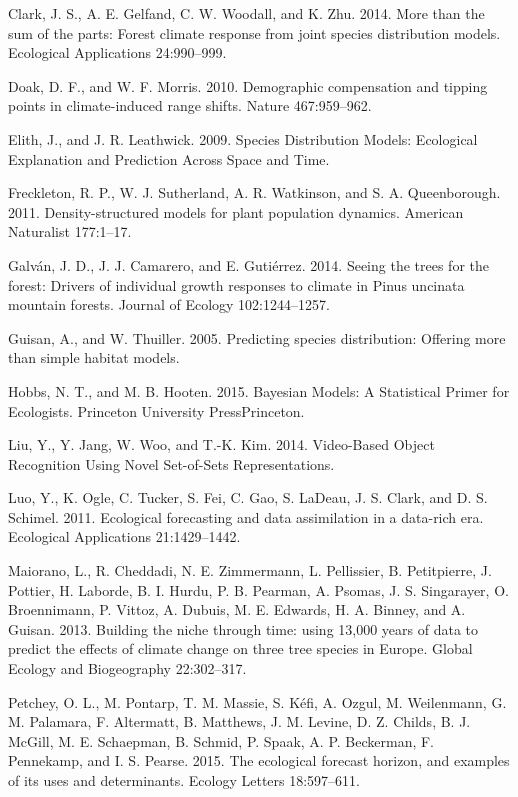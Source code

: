 \documentclass[12pt,]{article}
\begin{document}
Clark, J. S., A. E. Gelfand, C. W. Woodall, and K. Zhu. 2014. More than
the sum of the parts: Forest climate response from joint species
distribution models. Ecological Applications 24:990--999.

Doak, D. F., and W. F. Morris. 2010. Demographic compensation and
tipping points in climate-induced range shifts. Nature 467:959--962.

Elith, J., and J. R. Leathwick. 2009. Species Distribution Models:
Ecological Explanation and Prediction Across Space and Time.

Freckleton, R. P., W. J. Sutherland, A. R. Watkinson, and S. A.
Queenborough. 2011. Density-structured models for plant population
dynamics. American Naturalist 177:1--17.

Galván, J. D., J. J. Camarero, and E. Gutiérrez. 2014. Seeing the trees
for the forest: Drivers of individual growth responses to climate in
Pinus uncinata mountain forests. Journal of Ecology 102:1244--1257.

Guisan, A., and W. Thuiller. 2005. Predicting species distribution:
Offering more than simple habitat models.

Hobbs, N. T., and M. B. Hooten. 2015. Bayesian Models: A Statistical
Primer for Ecologists. Princeton University PressPrinceton.

Liu, Y., Y. Jang, W. Woo, and T.-K. Kim. 2014. Video-Based Object
Recognition Using Novel Set-of-Sets Representations.

Luo, Y., K. Ogle, C. Tucker, S. Fei, C. Gao, S. LaDeau, J. S. Clark, and
D. S. Schimel. 2011. Ecological forecasting and data assimilation in a
data-rich era. Ecological Applications 21:1429--1442.

Maiorano, L., R. Cheddadi, N. E. Zimmermann, L. Pellissier, B.
Petitpierre, J. Pottier, H. Laborde, B. I. Hurdu, P. B. Pearman, A.
Psomas, J. S. Singarayer, O. Broennimann, P. Vittoz, A. Dubuis, M. E.
Edwards, H. A. Binney, and A. Guisan. 2013. Building the niche through
time: using 13,000 years of data to predict the effects of climate
change on three tree species in Europe. Global Ecology and Biogeography
22:302--317.

Petchey, O. L., M. Pontarp, T. M. Massie, S. Kéfi, A. Ozgul, M.
Weilenmann, G. M. Palamara, F. Altermatt, B. Matthews, J. M. Levine, D.
Z. Childs, B. J. McGill, M. E. Schaepman, B. Schmid, P. Spaak, A. P.
Beckerman, F. Pennekamp, and I. S. Pearse. 2015. The ecological forecast
horizon, and examples of its uses and determinants. Ecology Letters
18:597--611.
\end{document}
